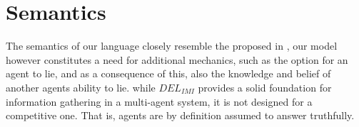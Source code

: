 \section{Semantics}
The semantics of our language closely resemble the proposed in \cite{delimi}, our model however constitutes a need for additional mechanics, such as the option for an agent to lie, and as a consequence of this, also the knowledge and belief of another agents ability to lie. while $DEL_{IMI}$ provides a solid foundation for information gathering in a multi-agent system, it is not designed for a competitive one. That is, agents are by definition assumed to answer truthfully. 